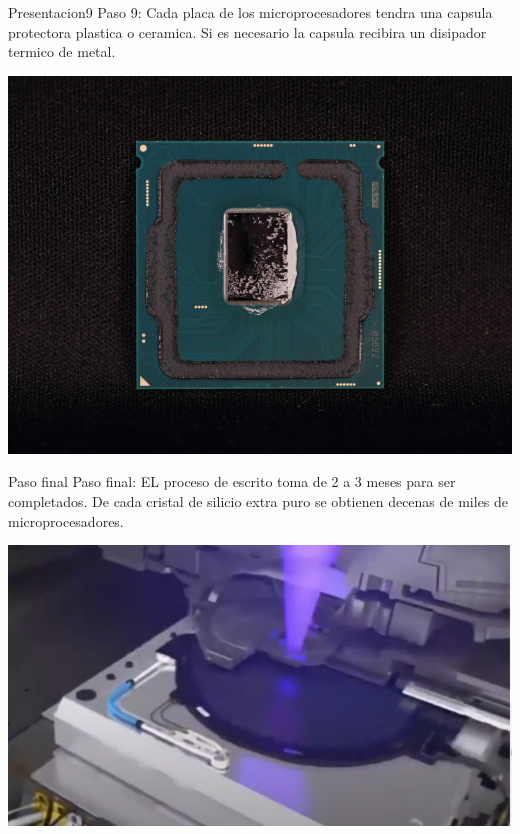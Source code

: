 \documentclass[presentation]{beamer}
\begin{document}
\begin{frame}[label={sec:orgb462fc8}]{Presentacion9}
Paso 9:
Cada placa de los microprocesadores tendra una capsula protectora plastica o ceramica.
Si es necesario la capsula recibira un disipador termico de metal.
\begin{center}
\includegraphics[width=.9\linewidth]{./paso9.jpg}
\end{center}
\end{frame}

\begin{frame}[label={sec:org7e9cda1}]{Paso final}
Paso final:
EL proceso de escrito toma de 2 a 3 meses para ser completados.
De cada cristal de silicio extra puro se obtienen decenas de miles de microprocesadores.
\begin{center}
\includegraphics[width=.9\linewidth]{./paso10.jpeg}
\end{center}
\end{frame}
\end{document}
